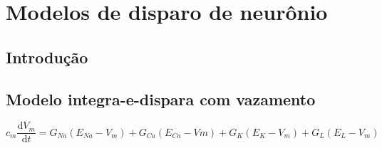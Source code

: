 \chapter{Modelos de disparo de neurônio}\label{cap:modelos}
\section{Introdução}\label{sec:modelos_intro}

\section{Modelo integra-e-dispara com vazamento}\label{sec:modelolif}
\nocite{lapicque_recherches_1907}

\begin{equation}
c_m\frac{\mathrm{d}V_m}{\mathrm{d}t}=G_{Na}(E_{Na}-V_m)+G_{Ca}(E_{Ca}-Vm)+G_K(E_K-V_m)+G_L(E_L-V_m)
\end{equation}

